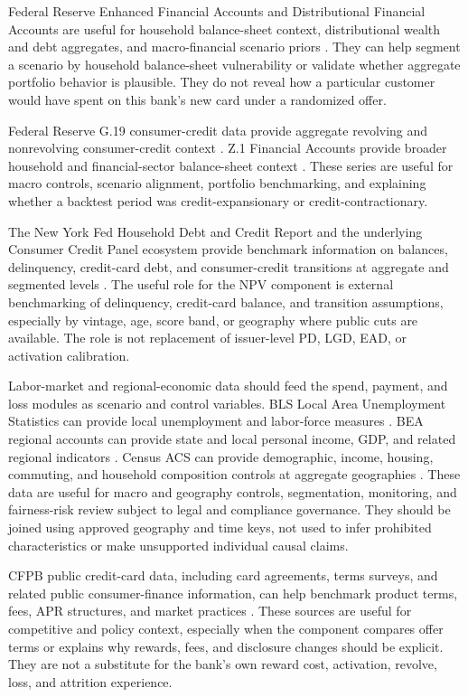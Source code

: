 \documentclass[11pt]{article}
\newcommand{\1}{\mathbf{1}}
\begin{document}
Federal Reserve Enhanced Financial Accounts and Distributional Financial
Accounts are useful for household balance-sheet context, distributional wealth
and debt aggregates, and macro-financial scenario priors
\citep{federalreserveEFA}. They can help segment a scenario by household
balance-sheet vulnerability or validate whether aggregate portfolio behavior is
plausible. They do not reveal how a particular customer would have spent on
this bank's new card under a randomized offer.

Federal Reserve G.19 consumer-credit data provide aggregate revolving and
nonrevolving consumer-credit context \citep{federalreserveG19}. Z.1 Financial
Accounts provide broader household and financial-sector balance-sheet context
\citep{federalreserveZ1}. These series are useful for macro controls, scenario
alignment, portfolio benchmarking, and explaining whether a backtest period was
credit-expansionary or credit-contractionary.

The New York Fed Household Debt and Credit Report and the underlying Consumer
Credit Panel ecosystem provide benchmark information on balances, delinquency,
credit-card debt, and consumer-credit transitions at aggregate and segmented
levels \citep{nyfedHhdc}. The useful role for the NPV component is external
benchmarking of delinquency, credit-card balance, and transition assumptions,
especially by vintage, age, score band, or geography where public cuts are
available. The role is not replacement of issuer-level PD, LGD, EAD, or
activation calibration.

Labor-market and regional-economic data should feed the spend, payment, and
loss modules as scenario and control variables. BLS Local Area Unemployment
Statistics can provide local unemployment and labor-force measures
\citep{blsLAUS}. BEA regional accounts can provide state and local personal
income, GDP, and related regional indicators \citep{beaRegional}. Census ACS
can provide demographic, income, housing, commuting, and household composition
controls at aggregate geographies \citep{censusACS}. These data are useful for
macro and geography controls, segmentation, monitoring, and fairness-risk
review subject to legal and compliance governance. They should be joined using
approved geography and time keys, not used to infer prohibited characteristics
or make unsupported individual causal claims.

CFPB public credit-card data, including card agreements, terms surveys, and
related public consumer-finance information, can help benchmark product terms,
fees, APR structures, and market practices \citep{cfpbCreditCardData}. These
sources are useful for competitive and policy context, especially when the
component compares offer terms or explains why rewards, fees, and disclosure
changes should be explicit. They are not a substitute for the bank's own reward
cost, activation, revolve, loss, and attrition experience.
\end{document}
